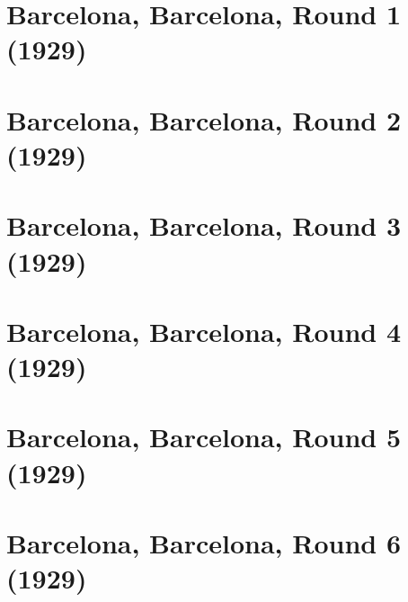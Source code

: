 \documentclass[11pt]{article}
\begin{document}


\clearpage



\clearpage



\clearpage



\clearpage



\clearpage



\clearpage



\clearpage



\clearpage

\section{Barcelona, Barcelona, Round 1 (1929)}


\clearpage

\section{Barcelona, Barcelona, Round 2 (1929)}


\clearpage

\section{Barcelona, Barcelona, Round 3 (1929)}


\clearpage

\section{Barcelona, Barcelona, Round 4 (1929)}


\clearpage

\section{Barcelona, Barcelona, Round 5 (1929)}


\clearpage

\section{Barcelona, Barcelona, Round 6 (1929)}

\end{document}
